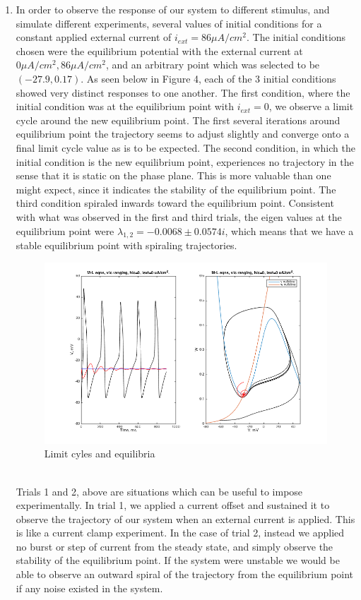 \documentclass[10pt]{report}
\begin{document}
\begin{enumerate}
\item In order to observe the response of our system to different stimulus, and simulate different experiments, several values of initial conditions for a constant applied external current of $i_{ext}=86 \mu A/cm^2$. The initial conditions chosen were the equilibrium potential with the external current at $0 \mu A/cm^2, 86 \mu A/cm^2$, and an arbitrary point which was selected to be $(-27.9, 0.17)$. As seen below in Figure 4, each of the 3 initial conditions showed very distinct responses to one another. The first condition, where the initial condition was at the equilibrium point with $i_{ext} = 0$, we observe a limit cycle around the new equilibrium point. The first several iterations around equilibrium point the trajectory seems to adjust slightly and converge onto a final limit cycle value as is to be expected. The second condition, in which the initial condition is the new equilibrium point, experiences no trajectory in the sense that it is static on the phase plane. This is more valuable than one might expect, since it indicates the stability of the equilibrium point. The third condition spiraled inwards toward the equilibrium point. Consistent with what was observed in the first and third trials, the eigen values at the equilibrium point were $ \lambda_{1,2} = -0.0068 \pm 0.0574i$, which means that we have a stable equilibrium point with spiraling trajectories. \begin{figure}[h!] \includegraphics[scale=0.47]{motnq8.png} \caption[h4]{Limit cyles and equilibria} \end{figure}\\ Trials 1 and 2, above are situations which can be useful to impose experimentally. In trial 1, we applied a current offset and sustained it to observe the trajectory of our system when an external current is applied. This is like a current clamp experiment. In the case of trial 2, instead we applied no burst or step of current from the steady state, and simply observe the stability of the equilibrium point. If the system were unstable we would be able to observe an outward spiral of the trajectory from the equilibrium point if any noise existed in the system.

\end{enumerate}
\end{document}
